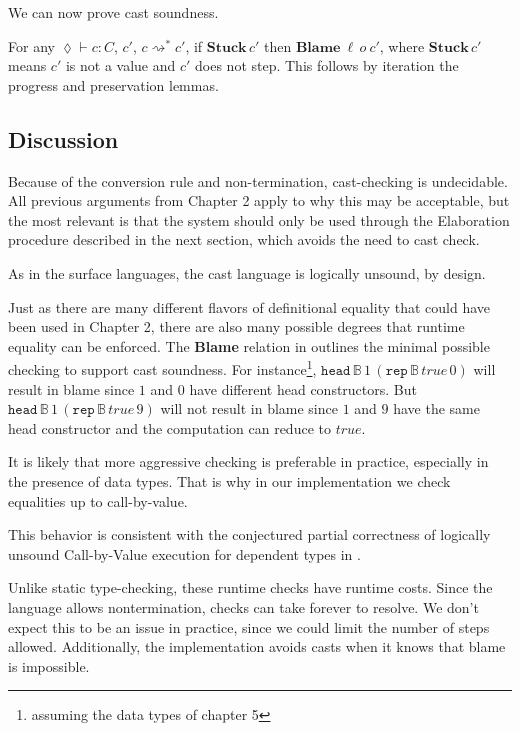 
We can now prove cast soundness.

For any $\lozenge\vdash c:C$, $c'$, $c\rightsquigarrow^{*}c'$, if $\textbf{Stuck}\,c'$ then $\textbf{Blame}\:\ensuremath{\ell}\,o\:c'$, where $\textbf{Stuck}\,c'$ means $c'$ is not a value and $c'$ does not step.
This follows by iteration the progress and preservation lemmas.

\subsection{Discussion}



Because of the conversion rule and non-termination, cast-checking is undecidable.
All previous arguments from Chapter 2 apply to why this may be acceptable, but the most relevant is that the system should only be used through the Elaboration procedure described in the next section, which avoids the need to cast check.


As in the surface languages, the cast language is logically unsound, by design.

Just as there are many different flavors of definitional equality that could have been used in Chapter 2, there are also many possible degrees that runtime equality can be enforced.
The \textbf{Blame} relation in  outlines the minimal possible checking to support cast soundness.
For instance\footnote{assuming the data types of chapter 5}, $\mathtt{head}\,\mathbb{B}\,1\,\left(\mathtt{rep}\,\mathbb{B}\,true\,0\right)$ will result in blame since $1$ and $0$ have different head constructors.
But $\mathtt{head}\,\mathbb{B}\,1\,\left(\mathtt{rep}\,\mathbb{B}\,true\,9\right)$ will not result in blame since $1$ and $9$ have the same head constructor and the computation can reduce to $true$. 

It is likely that more aggressive checking is preferable in practice, especially in the presence of data types.
That is why in our implementation we check equalities up to call-by-value. 

This behavior is consistent with the conjectured partial correctness of logically unsound Call-by-Value execution for dependent types in \cite{jia2010dependent}. 


Unlike static type-checking, these runtime checks have runtime costs.
Since the language allows nontermination, checks can take forever to resolve.
We don't expect this to be an issue in practice, since we could limit the number of steps allowed.
Additionally, the implementation avoids casts when it knows that blame is impossible.
